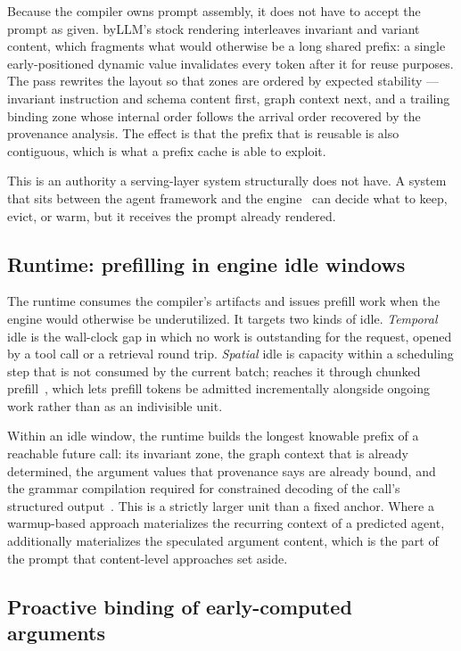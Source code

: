 Because the compiler owns prompt assembly, it does not have to accept the prompt
as given. byLLM's stock rendering interleaves invariant and variant content, which
fragments what would otherwise be a long shared prefix: a single early-positioned
dynamic value invalidates every token after it for reuse purposes. The pass
rewrites the layout so that zones are ordered by expected stability --- invariant
instruction and schema content first, graph context next, and a trailing binding
zone whose internal order follows the arrival order recovered by the provenance
analysis. The effect is that the prefix that is reusable is also contiguous, which
is what a prefix cache is able to exploit.

This is an authority a serving-layer system structurally does not have. A system
that sits between the agent framework and the
engine~\cite{zhang2026cachescout,yu2026pythia} can decide what to keep, evict, or
warm, but it receives the prompt already rendered.

\subsection{Runtime: prefilling in engine idle windows}

The runtime consumes the compiler's artifacts and issues prefill work when the
engine would otherwise be underutilized. It targets two kinds of idle. \emph{Temporal}
idle is the wall-clock gap in which no work is outstanding for the request,
opened by a tool call or a retrieval round trip. \emph{Spatial} idle is capacity
within a scheduling step that is not consumed by the current batch; \sysname{}
reaches it through chunked prefill~\cite{agrawal2024sarathi}, which lets prefill
tokens be admitted incrementally alongside ongoing work rather than as an
indivisible unit.

Within an idle window, the runtime builds the longest knowable prefix of a
reachable future call: its invariant zone, the graph context that is already
determined, the argument values that provenance says are already bound, and the
grammar compilation required for constrained decoding of the call's structured
output~\cite{dong2025xgrammar}. This is a strictly larger unit than a fixed
anchor. Where a warmup-based approach materializes the recurring context of a
predicted agent, \sysname{} additionally materializes the speculated argument
content, which is the part of the prompt that content-level approaches set aside.

\subsection{Proactive binding of early-computed arguments}

